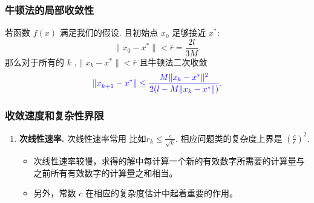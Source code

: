 \documentclass[handout,10pt]{beamer} %
\begin{document}
\begin{frame}[fragile]
\frametitle{牛顿法的局部收敛性}

\begin{theorem}[定理]\label{TH_1_2_5}
    若函数 $f(x)$ 满足我们的假设.
   且初始点 $x_0$ 足够接近 $x^*$:
    $$
        \|x_0 - x^* \|  < \bar{r} = \frac{2l}{3M}.
    $$
   那么对于所有的 $k$ ,$\|x_k -x^*\| < \bar{r}$ 且牛顿法二次收敛
    $$
   {\color{blue} \|x_{k+1}^{}-x^*\| \leq \frac{M \|x_k -x^*\|^2}{2(l-M \|x_k - x^*\|)}. }
$$
\end{theorem}





\end{frame}

\begin{frame}[fragile]
\frametitle{收敛速度和复杂性界限}



\begin{enumerate}
\item<only@1> \textbf{次线性速率.} 次线性速率常用
  比如$r_k \leq \frac{c}{\sqrt{k}}$. 相应问题类的复杂度上界是 $ \left(\frac{c}{\epsilon} \right)^2$.

  \begin{itemize}
  \item 次线性速率较慢，求得的解中每计算一个新的有效数字所需要的计算量与之前所有有效数字的计算量之和相当。
  \item 另外，常数 $c$ 在相应的复杂度估计中起着重要的作用。
  \end{itemize}



\end{enumerate}

\end{frame}
\end{document}
